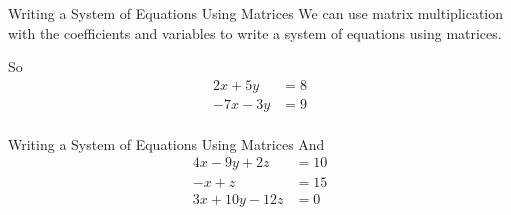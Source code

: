 \documentclass[t]{beamer}
\begin{document}
\begin{frame}{Writing a System of Equations Using Matrices}
We can use matrix multiplication with the coefficients and variables to write a system of equations using matrices.		\newline\\		\pause

So
\begin{align*}
2x + 5y &= 8 \\
-7x - 3y &= 9 \\
\end{align*}
\end{frame}

\begin{frame}{Writing a System of Equations Using Matrices}
And 
\begin{align*}
4x-9y+2z &= 10 \\
-x + z &= 15	\\
3x+10y-12z &= 0 \\
\end{align*}
\end{frame}
\end{document}

